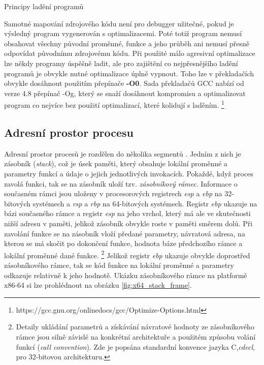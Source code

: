 \documentclass[czech,bachelor,male,python,dept460,hidelinks]{diploma}						%
\newcommand{\parspace}[1][]{
	\ifthenelse{\isempty{#1}}{\vspace{5mm}}{\vspace{#1}}
	\par
}
\begin{document}
\begin{section}{Principy ladění programů}
		\parspace Samotné mapování zdrojového kódu není pro debugger užitečné, pokud je výsledný program vygenerován s optimalizacemi. Poté
		totiž program nemusí obsahovat všechny původní proměnné, funkce a jeho průběh ani nemusí přesně odpovídat původnímu zdrojovému kódu.
		Při použité málo agresivní optimalizace lze někdy programy úspěšně ladit, ale pro zajištění co nejpřesnějšího ladění programů je obvykle nutné
		optimalizace úplně vypnout. Toho lze v překladačích obvykle dosáhnout použitím přepínače \textbf{-O0}. Sada překladačů GCC nabízí od verze 4.8
		přepínač -Og, který se snaží dosáhnout kompromisu a optimalizovat program co nejvíce bez použití optimalizací, které kolidují s laděním.
		\footnote{https://gcc.gnu.org/onlinedocs/gcc/Optimize-Options.html}
	
	\subsection{Adresní prostor procesu}
		Adresní prostor procesů je rozdělen do několika segmentů \cite[53]{tanenbaum}. Jedním z nich je zásobník (\textit{stack}), což je úsek paměti, který
		obsahuje lokální proměnné a parametry funkcí a údaje o jejich jednotlivých invokacích. Pokaždé, když proces zavolá funkci, tak se na zásobník uloží tzv.
		\textit{zásobníkový rámec}. Informace o současném rámci jsou uloženy v procesorových registrech \textit{esp} a \textit{ebp} na 32-bitových systémech
		a \textit{rsp} a \textit{rbp} na 64-bitových systémech. Registr \textit{ebp} ukazuje na bázi současného rámce a registr \textit{esp} na jeho vrchol, který
		má ale ve skutečnosti nižší adresu v paměti, jelikož zásobník obvykle roste v paměti směrem dolů. Při zavolání funkce se na zásobník vloží předané parametry,
		návratová adresa, na kterou se má skočit po dokončení funkce, hodnota báze předchozího rámce a lokální proměnné dané funkce.
		\footnote{Detaily ukládání parametrů a získávání návratové hodnoty ze zásobníkového rámce jsou silně závislé na konkrétní architektuře
		a použitém způsobu volání funkcí (\textit{call convention}). Zde je popsána standardní konvence jazyka C,\textit{cdecl}, pro 32-bitovou architekturu.}
		Jelikož registr \textit{ebp} ukazuje obvykle doprostřed zásobníkového rámce, tak se kód funkce na lokální proměnné a parametry odkazuje
		relativně k jeho hodnotě. Ukázku zásobníkového rámce na platformě x86-64 si lze prohlédnout na obrázku \ref{fig:x64_stack_frame}.
		
		

\end{section}
\end{document}
